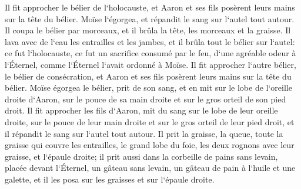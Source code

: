 \verse Il fit approcher le bélier de l`holocauste, et Aaron et ses fils posèrent leurs mains sur la tête du bélier. 
\verse Moïse l`égorgea, et répandit le sang sur l`autel tout autour. 
\verse Il coupa le bélier par morceaux, et il brûla la tête, les morceaux et la graisse. 
\verse Il lava avec de l`eau les entrailles et les jambes, et il brûla tout le bélier sur l`autel: ce fut l`holocauste, ce fut un sacrifice consumé par le feu, d`une agréable odeur à l`Éternel, comme l`Éternel l`avait ordonné à Moïse. 
\verse Il fit approcher l`autre bélier, le bélier de consécration, et Aaron et ses fils posèrent leurs mains sur la tête du bélier. 
\verse Moïse égorgea le bélier, prit de son sang, et en mit sur le lobe de l`oreille droite d`Aaron, sur le pouce de sa main droite et sur le gros orteil de son pied droit. 
\verse Il fit approcher les fils d`Aaron, mit du sang sur le lobe de leur oreille droite, sur le pouce de leur main droite et sur le gros orteil de leur pied droit, et il répandit le sang sur l`autel tout autour. 
\verse Il prit la graisse, la queue, toute la graisse qui couvre les entrailles, le grand lobe du foie, les deux rognons avec leur graisse, et l`épaule droite; 
\verse il prit aussi dans la corbeille de pains sans levain, placée devant l`Éternel, un gâteau sans levain, un gâteau de pain à l`huile et une galette, et il les posa sur les graisses et sur l`épaule droite. 
